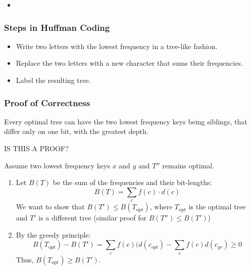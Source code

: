 \begin{example}
    \begin{itemize}
        \item 
    \end{itemize}
\end{example}

\subsubsection{Steps in Huffman Coding}
\begin{itemize}
    \item Write two letters with the lowest frequency in a tree-like fashion.
    \item Replace the two letters with a new character that sums their frequencies.
    \item Label the resulting tree.
\end{itemize}

\subsubsection{Proof of Correctness}
\begin{theorem}
Every optimal tree can have the two lowest frequency keys being siblings, that differ only on one bit, with the greatest depth.

\end{theorem}

IS THIS A PROOF?
\begin{derivation}
    Assume two lowest frequency keys $x$ and $y$ and $T''$ remains optimal. 
    \vspace{1em}

    \begin{enumerate}
        \item Let $B(T)$ be the sum of the frequencies and their bit-lengths:
        \[
        B(T) = \sum_c f(c) \cdot d(c)
        \]
        We want to show that $B(T') \leq B(T_{\text{opt}})$, where $T_{\text{opt}}$ is the optimal tree and $T'$ is a different tree (similar proof for $B(T'') \leq B(T')$)
        \vspace{1em}
    
        \item By the greedy principle:
        \[
        B(T_{\text{opt}}) - B(T') = \sum_c f(c)(d(c_{opt}) - \sum_c f(c) d(c_{gr}) \geq 0
        \]
        Thus, $B(T_{\text{opt}}) \geq B(T')$.
    \end{enumerate}
\end{derivation}

